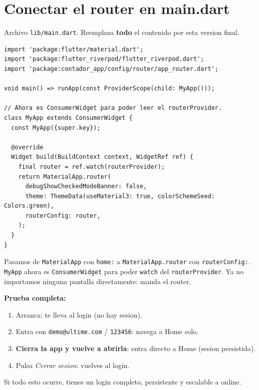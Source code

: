 \documentclass[11pt,a4paper,oneside]{book}
\newcommand{\file}[1]{\texttt{\textcolor{brandDark}{#1}}}
\begin{document}
\section{Conectar el router en main.dart}
\begin{wherebox}
Archivo \file{lib/main.dart}. Reemplaza \textbf{todo} el contenido por esta version
final.
\end{wherebox}

\begin{lstlisting}
import 'package:flutter/material.dart';
import 'package:flutter_riverpod/flutter_riverpod.dart';
import 'package:contador_app/config/router/app_router.dart';

void main() => runApp(const ProviderScope(child: MyApp()));

// Ahora es ConsumerWidget para poder leer el routerProvider.
class MyApp extends ConsumerWidget {
  const MyApp({super.key});

  @override
  Widget build(BuildContext context, WidgetRef ref) {
    final router = ref.watch(routerProvider);
    return MaterialApp.router(
      debugShowCheckedModeBanner: false,
      theme: ThemeData(useMaterial3: true, colorSchemeSeed: Colors.green),
      routerConfig: router,
    );
  }
}
\end{lstlisting}

\begin{whatbox}
Pasamos de \texttt{MaterialApp} con \texttt{home:} a \texttt{MaterialApp.router} con
\texttt{routerConfig:}. \file{MyApp} ahora es \texttt{ConsumerWidget} para poder
\texttt{watch} del \texttt{routerProvider}. Ya no importamos ninguna pantalla
directamente: manda el router.
\end{whatbox}

\begin{tipbox}
\textbf{Prueba completa:}
\begin{enumerate}
  \item Arranca: te lleva al login (no hay sesion).
  \item Entra con \texttt{demo@ultime.com} / \texttt{123456}: navega a Home solo.
  \item \textbf{Cierra la app y vuelve a abrirla}: entra directo a Home (sesion persistida).
  \item Pulsa \emph{Cerrar sesion}: vuelves al login.
\end{enumerate}
Si todo esto ocurre, tienes un login completo, persistente y escalable a online.
\end{tipbox}
\end{document}
